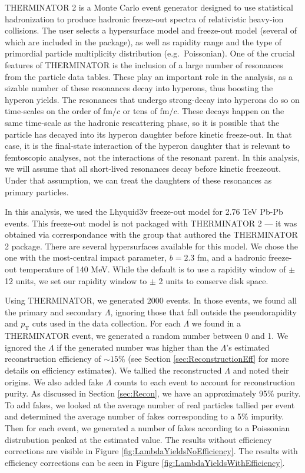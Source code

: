 THERMINATOR 2 is a Monte Carlo event generator designed to use statistical hadronization to produce hadronic freeze-out spectra of relativistic heavy-ion collisions. 
The user selects a hypersurface model and freeze-out model (several of which are included in the package), as well as rapidity range and the type of primordial particle multiplicity distribution (e.g.\ Poissonian). 
One of the crucial features of THERMINATOR is the inclusion of a large number of resonances from the particle data tables. 
These play an important role in the analysis, as a sizable number of these resonances decay into hyperons, thus boosting the hyperon yields. 
The resonances that undergo strong-decay into hyperons do so on time-scales on the order of $\mathrm{fm}/c$ or tens of $\mathrm{fm}/c$. 
These decays happen on the same time-scale as the hadronic rescattering phase, so it is possible that the particle has decayed into its hyperon daughter before kinetic freeze-out. 
In that case, it is the final-state interaction of the hyperon daughter that is relevant to femtoscopic analyses, not the interactions of the resonant parent.  
In this analysis, we will assume that all short-lived resonances decay before kinetic freezeout. 
Under that assumption, we can treat the daughters of these resonances as primary particles. 

In this analysis, we used the Lhyquid3v freeze-out model for 2.76 TeV Pb-Pb events. This freeze-out model is not packaged with THERMINATOR 2 --- it was obtained via correspondance with the group that authored the THERMINATOR 2 package.
There are several hypersurfaces available for this model.
We chose the one with the most-central impact parameter, $b = 2.3$ fm, and a hadronic freeze-out temperature of 140 MeV.
While the default is to use a rapidity window of $\pm$ 12 units, we set our rapidity window to $\pm$ 2 units to conserve disk space.

Using THERMINATOR, we generated 2000 events. 
In those events, we found all the primary and secondary $\Lambda$, ignoring those that fall outside the pseudorapidity and $p_\mathrm{T}$ cuts used in the data collection.
For each $\Lambda$ we found in a THERMINATOR event, we generated a random number between 0 and 1. 
We ignored the $\Lambda$ if the generated number was higher than the $\Lambda$'s estimated reconstruction efficiency of $\sim15\%$ (see Section \ref{sec:ReconstructionEff} for more details on efficiency estimates). 
We tallied the reconstructed $\Lambda$ and noted their origins. 
We also added fake $\Lambda$ counts to each event to account for reconstruction purity.
As discussed in Section \ref{sec:Recon}, we have an approximately 95\% purity.
To add fakes, we looked at the average number of real particles tallied per event and determined the average number of fakes corresponding to a 5\% impurity.
Then for each event, we generated a number of fakes according to a Poissonian distrubution peaked at the estimated value.
The results without efficiency corrections are visible in Figure \ref{fig:LambdaYieldsNoEfficiency}. 
The results with efficiency corrections can be seen in Figure \ref{fig:LambdaYieldsWithEfficiency}.


